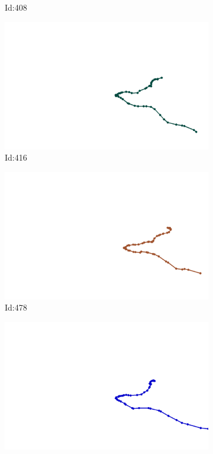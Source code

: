 \documentclass[12pt,twoside]{report}
\begin{document}
\begin{figure}
\begin{subfigure}[b]{0.20\textwidth}
\caption{Id:408}
\end{subfigure}
\begin{subfigure}[b]{0.20\textwidth}
\centering
\includegraphics[width=\textwidth]{../../trajectories/416.png}
\caption{Id:416}
\end{subfigure}
\begin{subfigure}[b]{0.20\textwidth}
\centering
\includegraphics[width=\textwidth]{../../trajectories/478.png}
\caption{Id:478}
\end{subfigure}
\begin{subfigure}[b]{0.20\textwidth}
\centering
\includegraphics[width=\textwidth]{../../trajectories/644.png}

\end{subfigure}
\end{figure}
\end{document}
